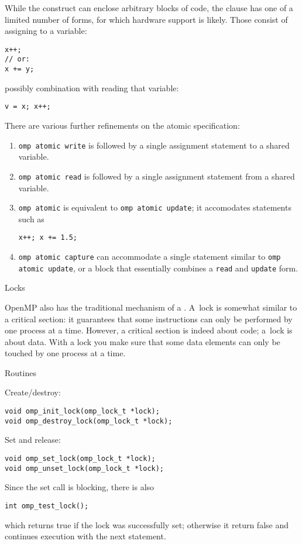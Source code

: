 While the  construct can enclose arbitrary blocks of code,
the  clause has one of a limited number of forms,
for which hardware support is likely.
Those consist of assigning to a variable:
\begin{lstlisting}[language=omp]
x++;
// or:
x += y;
\end{lstlisting}
possibly combination with reading that variable:
\begin{lstlisting}[language=omp]
v = x; x++;
\end{lstlisting}

There are various further refinements on the atomic specification:
\begin{enumerate}
\item \lstinline[language=omp]{omp atomic write} is followed by  a single assignment statement
  to a shared variable.
\item \lstinline[language=omp]{omp atomic read} is followed by  a single assignment statement
  from a shared variable.
\item \lstinline[language=omp]{omp atomic} is equivalent to \lstinline[language=omp]{omp atomic update};
  it accomodates statements such as 
  \begin{lstlisting}[language=omp]
    x++; x += 1.5;
  \end{lstlisting}
\item \lstinline[language=omp]{omp atomic capture} can accommodate a single statement
  similar to \lstinline[language=omp]{omp atomic update},
  or a block that essentially combines a \lstinline[language=omp]{read} and \lstinline[language=omp]{update} form.
\end{enumerate}


 {Locks}
\label{sec:ompref:locks}

OpenMP also has the traditional mechanism of a . A~lock is somewhat similar to 
a critical section: it guarantees that some instructions can only be performed by one
process at a time. However, a critical section is indeed about code; a~lock is about data.
With a lock you make sure that some data elements can only be touched by one process at a time.

 {Routines}

Create/destroy:
\begin{lstlisting}[language=omp]
void omp_init_lock(omp_lock_t *lock);
void omp_destroy_lock(omp_lock_t *lock);
\end{lstlisting}
Set and release:
\begin{lstlisting}[language=omp]
void omp_set_lock(omp_lock_t *lock);
void omp_unset_lock(omp_lock_t *lock);
\end{lstlisting}
Since the set call is blocking, there is also 
\begin{lstlisting}[language=omp]
int omp_test_lock();
\end{lstlisting}
which returns true if the lock was successfully set;
otherwise it return false and continues execution with the next statement.

